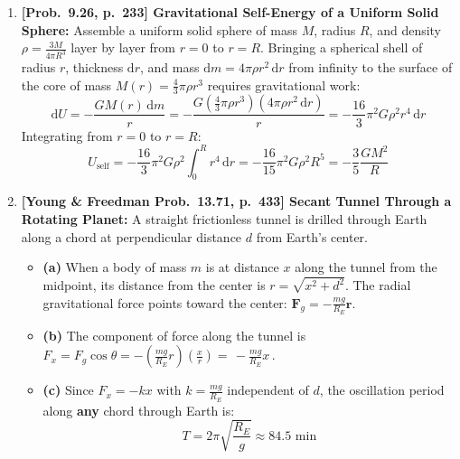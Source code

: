 \documentclass[11pt,a4paper,openany,oneside]{book}
\newcommand{\eqbox}[1]{\boxed{\,#1\,}}
\newcommand{\vect}[1]{\mathbf{#1}}
\newcommand{\dd}{\,\mathrm{d}}
\newcommand{\diff}{\mathrm{d}}
\numberwithin{equation}{chapter}
\begin{document}
\begin{enumerate}[label=\textbf{Prob.\ 9.\arabic*},leftmargin=4.2em]
  \item \textbf{[Prob.\ 9.26, p.\ 233] Gravitational Self-Energy of a Uniform Solid Sphere:}
  Assemble a uniform solid sphere of mass $M$, radius $R$, and density $\rho = \frac{3M}{4\pi R^3}$ layer by layer from $r = 0$ to $r = R$. Bringing a spherical shell of radius $r$, thickness $\diff r$, and mass $\diff m = 4\pi\rho r^2\dd r$ from infinity to the surface of the core of mass $M(r) = \frac{4}{3}\pi\rho r^3$ requires gravitational work:
  \begin{equation*}
    \diff U = -\frac{GM(r)\dd m}{r} = -\frac{G\left(\frac{4}{3}\pi\rho r^3\right)(4\pi\rho r^2\dd r)}{r} = -\frac{16}{3}\pi^2 G\rho^2 r^4\dd r
  \end{equation*}
  Integrating from $r = 0$ to $r = R$:
  \begin{equation*}
    \eqbox{U_{\text{self}} = -\frac{16}{3}\pi^2 G\rho^2\int_0^R r^4\dd r = -\frac{16}{15}\pi^2 G\rho^2 R^5 = -\frac{3}{5}\frac{GM^2}{R}}
  \end{equation*}

  \item \textbf{[Young \& Freedman Prob.\ 13.71, p.\ 433] Secant Tunnel Through a Rotating Planet:}
  A straight frictionless tunnel is drilled through Earth along a chord at perpendicular distance $d$ from Earth's center.
  \begin{itemize}
    \item \textbf{(a)} When a body of mass $m$ is at distance $x$ along the tunnel from the midpoint, its distance from the center is $r = \sqrt{x^2 + d^2}$. The radial gravitational force points toward the center: $\vect{F}_g = -\frac{mg}{R_E}\vect{r}$.
    \item \textbf{(b)} The component of force along the tunnel is $F_x = F_g\cos\theta = -\left(\frac{mg}{R_E}r\right)\!\left(\frac{x}{r}\right) = \eqbox{-\frac{mg}{R_E}x}$.
    \item \textbf{(c)} Since $F_x = -kx$ with $k = \frac{mg}{R_E}$ independent of $d$, the oscillation period along \textbf{any} chord through Earth is:
    \begin{equation*}
      \eqbox{T = 2\pi\sqrt{\frac{R_E}{g}} \approx 84.5\text{ min}}
    \end{equation*}
  \end{itemize}


\end{enumerate}
\end{document}
